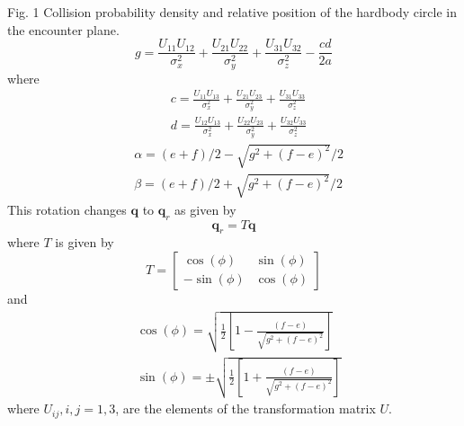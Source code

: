 \documentclass[10pt]{article}
\begin{document}
Fig. 1 Collision probability density and relative position of the hardbody circle in the encounter plane.
$$
g=\frac{U_{11} U_{12}}{\sigma_{x}^{2}}+\frac{U_{21} U_{22}}{\sigma_{y}^{2}}+\frac{U_{31} U_{32}}{\sigma_{z}^{2}}-\frac{c d}{2 a}
$$
where
$$
\begin{aligned}
&c=\frac{U_{11} U_{13}}{\sigma_{x}^{2}}+\frac{U_{21} U_{23}}{\sigma_{y}^{2}}+\frac{U_{31} U_{33}}{\sigma_{z}^{2}} \\
&d=\frac{U_{12} U_{13}}{\sigma_{x}^{2}}+\frac{U_{22} U_{23}}{\sigma_{y}^{2}}+\frac{U_{32} U_{33}}{\sigma_{z}^{2}}
\end{aligned}
$$
$$
\begin{aligned}
&\alpha=(e+f) / 2-\sqrt{g^{2}+(f-e)^{2}} / 2 \\
&\beta=(e+f) / 2+\sqrt{g^{2}+(f-e)^{2}} / 2
\end{aligned}
$$
This rotation changes $\boldsymbol{q}$ to $\boldsymbol{q}_{r}$ as given by
$$
\boldsymbol{q}_{r}=T \boldsymbol{q}
$$
where $T$ is given by
$$
T=\left[\begin{array}{cc}
\cos (\phi) & \sin (\phi) \\
-\sin (\phi) & \cos (\phi)
\end{array}\right]
$$
and
$$
\begin{aligned}
&\cos (\phi)=\sqrt{\frac{1}{2}\left[1-\frac{(f-e)}{\sqrt{g^{2}+(f-e)^{2}}}\right]} \\
&\sin (\phi)=\pm \sqrt{\frac{1}{2}\left[1+\frac{(f-e)}{\sqrt{g^{2}+(f-e)^{2}}}\right]}
\end{aligned}
$$
where $U_{i j}, i, j=1,3$, are the elements of the transformation matrix $U$.
\end{document}

